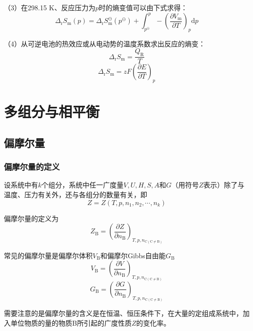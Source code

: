 \documentclass[lang=cn,newtx,11pt,scheme=chinese]{elegantbook}
\begin{document}
（3）在298.15 K、反应压力为$p$时的熵变值可以由下式求得：
\begin{equation}
	\Delta _\mathrm{r}S_\mathrm{m}(p)= \Delta _\mathrm{r}S^\ominus _\mathrm{m}(p^\ominus )
	+\int_{p^\ominus }^{p}-\left ( \frac{\partial V_\mathrm{m} }{\partial T}  \right )_p\mathrm{d}p 
\end{equation}

（4）从可逆电池的热效应或从电动势的温度系数求出反应的熵变：
\begin{equation}
	\Delta _\mathrm{r} S_\mathrm{m}=\frac{Q_\mathrm{R} }{T}  
\end{equation}
\begin{equation}
	\Delta _\mathrm{r} S_\mathrm{m}=zF\left ( \frac{\partial E}{\partial T}  \right )_p
\end{equation}

\chapter{多组分与相平衡}
\section{偏摩尔量}
\subsection{偏摩尔量的定义}
设系统中有$k$个组分，系统中任一广度量$V,U,H,S,A$和$G$（用符号$Z$表示）除了与温度、压力有关外，还与各组分的数量有关，即
\begin{equation}
	Z=Z(T,p,n_1,n_2,\cdots,n_k)
\end{equation}

偏摩尔量的定义为
\begin{equation}
	Z_\mathrm{B} = \left(\frac{\partial Z}{\partial n_\mathrm{B}}\right)_{T,p,n_{\mathrm{C}(\mathrm{C \ne B})}} 
\end{equation}

常见的偏摩尔量是偏摩尔体积$V_\mathrm{B}$和偏摩尔Gibbs自由能$G_\mathrm{B}$
\begin{equation}
	V_\mathrm{B}=\left ( \frac{\partial V}{\partial n_\mathrm{B} }  \right )_{T,p,n_{\mathrm{C}(\mathrm{C \ne B})}}   
\end{equation}
\begin{equation}
	G_\mathrm{B}=\left ( \frac{\partial G}{\partial n_\mathrm{B} }  \right )_{T,p,n_{\mathrm{C}(\mathrm{C \ne B})}}   
\end{equation}

需要注意的是偏摩尔量的含义是在恒温、恒压条件下，在大量的定组成系统中，加入单位物质的量的物质B所引起的广度性质$Z$的变化率。
\end{document}
